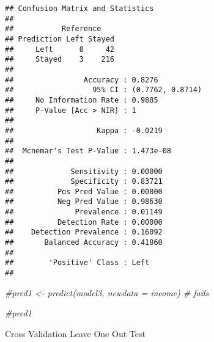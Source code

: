 \documentclass[
]{article}
\newenvironment{Shaded}{\begin{snugshade}}{\end{snugshade}}
\newcommand{\AttributeTok}[1]{\textcolor[rgb]{0.77,0.63,0.00}{#1}}
\newcommand{\CommentTok}[1]{\textcolor[rgb]{0.56,0.35,0.01}{\textit{#1}}}
\newcommand{\FunctionTok}[1]{\textcolor[rgb]{0.00,0.00,0.00}{#1}}
\newcommand{\NormalTok}[1]{#1}
\newcommand{\OtherTok}[1]{\textcolor[rgb]{0.56,0.35,0.01}{#1}}
\newcommand{\SpecialCharTok}[1]{\textcolor[rgb]{0.00,0.00,0.00}{#1}}
\newcommand{\StringTok}[1]{\textcolor[rgb]{0.31,0.60,0.02}{#1}}
\begin{document}
\begin{verbatim}
## Confusion Matrix and Statistics
## 
##           Reference
## Prediction Left Stayed
##     Left      0     42
##     Stayed    3    216
##                                           
##                Accuracy : 0.8276          
##                  95% CI : (0.7762, 0.8714)
##     No Information Rate : 0.9885          
##     P-Value [Acc > NIR] : 1               
##                                           
##                   Kappa : -0.0219         
##                                           
##  Mcnemar's Test P-Value : 1.473e-08       
##                                           
##             Sensitivity : 0.00000         
##             Specificity : 0.83721         
##          Pos Pred Value : 0.00000         
##          Neg Pred Value : 0.98630         
##              Prevalence : 0.01149         
##          Detection Rate : 0.00000         
##    Detection Prevalence : 0.16092         
##       Balanced Accuracy : 0.41860         
##                                           
##        'Positive' Class : Left            
## 
\end{verbatim}

\begin{Shaded}
\begin{Highlighting}[]
\CommentTok{\#pred1 \textless{}{-} predict(model3, newdata = income) \# fails}

\CommentTok{\#pred1}
\end{Highlighting}
\end{Shaded}

Cross Validation \textbar{} Leave One Out Test

\begin{Shaded}
\end{Shaded}
\end{document}
